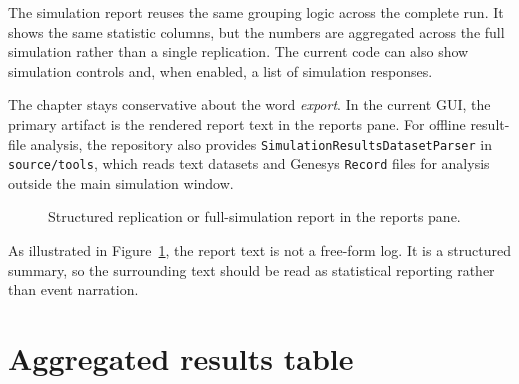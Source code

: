 The simulation report reuses the same grouping logic across the complete run.
It shows the same statistic columns, but the numbers are aggregated across the
full simulation rather than a single replication. The current code can also show
simulation controls and, when enabled, a list of simulation responses.

The chapter stays conservative about the word \textit{export}. In the current
GUI, the primary artifact is the rendered report text in the reports pane. For
offline result-file analysis, the repository also provides
\texttt{SimulationResultsDatasetParser} in \texttt{source/tools}, which reads
text datasets and Genesys \texttt{Record} files for analysis outside the main
simulation window.

\begin{figure}[htbp]
\centering
\caption{Structured replication or full-simulation report in the reports pane.}
\label{fig:results-report}
\end{figure}

As illustrated in Figure~\ref{fig:results-report}, the report text is not a
free-form log. It is a structured summary, so the surrounding text should be
read as statistical reporting rather than event narration.

\section{Aggregated results table}
\label{sec:results-table}

